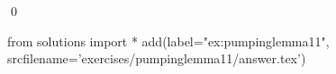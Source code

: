 
\begin{ex} 
  \label{ex:pumpinglemma11}
  
  \qed
\end{ex} 
\begin{python0}
from solutions import *
add(label="ex:pumpinglemma11",
    srcfilename='exercises/pumpinglemma11/answer.tex') 
\end{python0}
